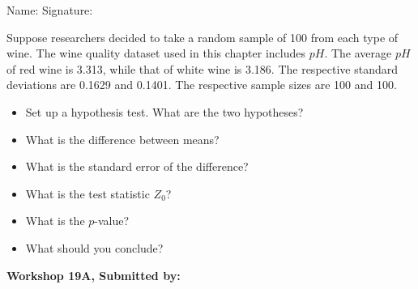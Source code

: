 \documentclass[11pt, chapterprefix=true]{scrbook}\usepackage[]{graphicx}\usepackage[]{color}
\begin{document}
\begin{exercises}
\begin{exercise}
\begin{center}
{{\vspace{4mm}
Name: \underline{\phantom{xxxxxxxxxxxxxxxxxxxxxxxx}} Signature: \underline{\phantom{xxxxxxxxxxxxxxxxxxxxxxxx}}
 }}
\end{center}   %

Suppose researchers decided to take a random sample of 100 from each type of wine.  The wine quality dataset used in this chapter includes $pH$. The average $pH$ of red wine is 3.313, while that of white wine is 3.186. The respective standard deviations are 0.1629 and 0.1401. The respective sample sizes are 100 and 100.

\begin{itemize}
  \item Set up a hypothesis test. What are the two hypotheses?
  \item What is the difference between means?
  \item What is the standard error of the difference?
  \item What is the test statistic $Z_0$?
  \item What is the $p$-value?
  \item What should you conclude?
\end{itemize}

\end{exercise} 
\begin{solution}  %


\end{solution}


\clearpage

    \begin{exercise}  %

    \begin{center}
\begin{flushleft}\textbf{\large \hfill Workshop 19A, Submitted by: }\end{flushleft}


\end{center}
\end{exercise}
\end{exercises}
\end{document}
